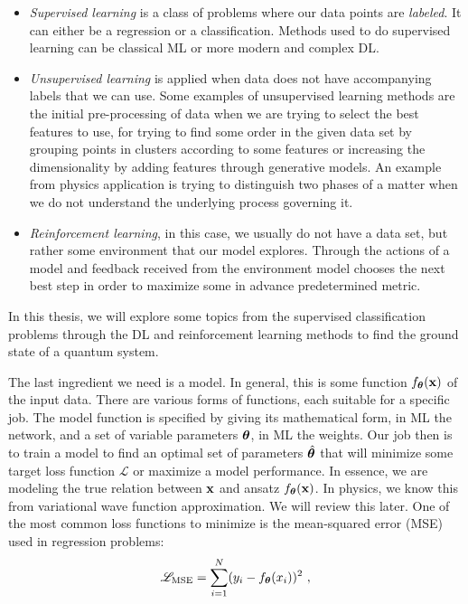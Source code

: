 \begin{itemize}
	\item \textit{Supervised learning} is a class of problems where our data points are \textit{labeled}. It can either be a regression or a classification. Methods used to do supervised learning can be classical ML or more modern and complex DL. 
	\item \textit{Unsupervised learning} is applied when data does not have accompanying labels that we can use. Some examples of unsupervised learning methods are the initial pre-processing of data when we are trying to select the best features to use, for trying to find some order in the given data set by grouping points in clusters according to some features or increasing the dimensionality by adding features through generative models. An example from physics application is trying to distinguish two phases of a matter when we do not understand the underlying process governing it.
	\item \textit{Reinforcement learning}, in this case, we usually do not have a data set, but rather some environment that our model explores. Through the actions of a model and feedback received from the environment model chooses the next best step in order to maximize some in advance predetermined metric.    
\end{itemize}
In this thesis, we will explore some topics from the supervised classification problems through the DL and reinforcement learning methods to find the ground state of a quantum system.
\par
The last ingredient we need is a model. In general, this is some function $f_{\boldsymbol{\theta}}(\vb{x})$ of the input data. There are various forms of functions, each suitable for a specific job. The model function is specified by giving its mathematical form, in ML the network, and a set of variable parameters $\boldsymbol{\theta}$, in ML the weights. Our job then is to train a model to find an optimal set of parameters $\hat{\boldsymbol{\theta}}$ that will minimize some target loss function $\mathcal{L}$ or maximize a model performance. In essence, we are modeling the true relation between $\vb{x}$ and ansatz $f_{\boldsymbol{\theta}}(\vb{x})$. In physics, we know this from variational wave function approximation. We will review this later. One of the most common loss functions to minimize is the mean-squared error (MSE) used in regression problems:
\begin{equation}
	\mathcal{L}_{\text{MSE}} = \sum_{i=1}^N (y_i - f_{\boldsymbol{\theta}}(x_i))^2 \ ,
\end{equation}
